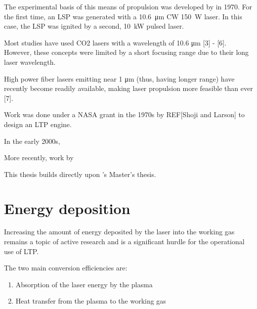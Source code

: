     

    The experimental basis of this means of propulsion was developed by \textcite{generalovContinuousOpticalDischarge1970} in 1970. For the first time, an LSP was generated with a \qty{10.6}{μm} CW  \qty{150}{W} laser. In this case, the LSP was ignited by a second, \qty{10}{kW} pulsed  laser.
    
    Most studies have used CO2 lasers with a wavelength of 10.6 μm [3] - [6]. However, these concepts were limited by a short focusing range due to their long laser wavelength. 
    
    High power fiber lasers emitting near 1 μm (thus, having longer range) have recently become readily available, making laser propulsion more feasible than ever [7].

    

        Work was done under a NASA grant in the 1970s by REF[Shoji and Larson] to design an LTP engine. 


        In the early 2000s, \textcite{toyodaThrustPerformanceCW2002} 

        More recently, work by 


        \textcite{luCharacteristicDiagnosticsLaserStabilized2022a} 


        This thesis builds directly upon \textcite{duplayArgonLaserPlasmaThruster2024a}'s Master's thesis. 

    \section{Energy deposition}

        Increasing the amount of energy deposited by the laser into the working gas remains a topic of active research and is a significant hurdle for the operational use of LTP.


        The two main conversion efficiencies are:
        \begin{enumerate}
            \item Absorption of the laser energy by the plasma
            \item Heat transfer from the plasma to the working gas
        \end{enumerate}


